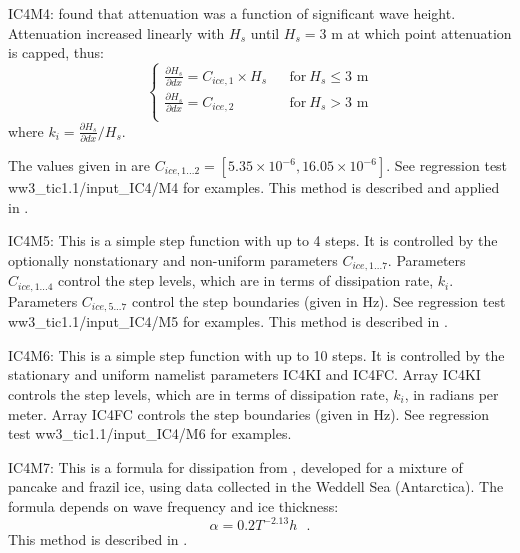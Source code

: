 {\code IC4M4}: \cite{art:Ko14} found that attenuation was a function of significant wave height. Attenuation increased linearly with ${H_s}$ until ${H_s} = 3$ m at which point attenuation is capped, thus:
\begin{equation}
\left \{
\begin{array}{llrcl}
{\frac{\partial H_s}{\partial dx}} = {C_{ice,1}}\times {H_s}   & & \text{for} \> {H_s} \leq 3 \text{ m}  \\
{\frac{\partial H_s}{\partial dx}} = {C_{ice,2}}               & & \text{for} \> {H_s} > 3 \text{ m}     \\
\end{array} \right .
\end{equation}
where {$k_i=\frac{\partial H_s}{\partial dx}/H_s$}.

The values given in \cite{art:Ko14} are ${C_{ice,1...2}}=[5.35\times 10^{-6}, 16.05\times 10^{-6}]$. See regression test {\file ww3\_tic1.1/input\_IC4/M4} for examples. This method is described and applied in \cite{rep:CR17}.

{\code IC4M5}: This is a simple step function with up to 4 steps. It is controlled by the optionally nonstationary and non-uniform parameters ${C_{ice,1...7}}$. Parameters ${C_{ice,1...4}}$ control the step levels, which are in terms of dissipation rate, ${k_i}$. Parameters ${C_{ice,5...7}}$ control the step boundaries (given in Hz). See regression test {\file ww3\_tic1.1/input\_IC4/M5} for examples. This method is described in \cite{rep:CR17}.

{\code IC4M6}: This is a simple step function with up to 10 steps. It is controlled by the stationary and uniform namelist parameters {\code IC4KI} and {\code IC4FC}. Array {\code IC4KI} controls the step levels, which are in terms of dissipation rate, ${k_i}$, in radians per meter. Array {\code IC4FC} controls the step boundaries (given in Hz). See regression test {\file ww3\_tic1.1/input\_IC4/M6} for examples. 

{\code IC4M7}: This is a formula for dissipation from \cite{art:Dob15}, developed for a mixture of pancake and frazil ice, using data collected in the Weddell Sea (Antarctica). The formula depends on wave frequency and ice thickness:
\begin{equation}\label{eq:ice7}
  {\alpha=0.2T^{-2.13}h} \:\:\: .
\end{equation}
This method is described in \cite{rep:RPLA18}.
